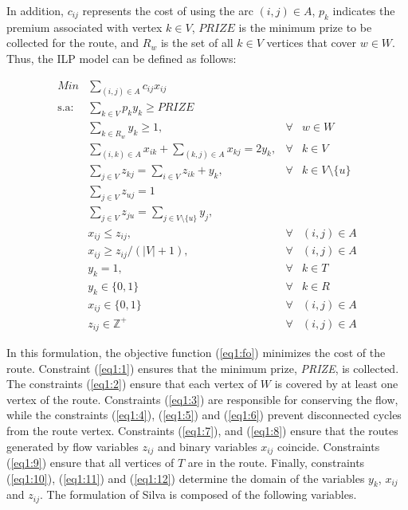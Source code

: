\documentclass{ro}
\begin{document}
In addition, $c_{ij}$ represents the cost of using the arc $(i,j) \in A$, $p_k$ indicates the premium associated with vertex $k\in V$, $PRIZE$ is the minimum prize to be collected for the route, and $R_w$ is the set of all $k\in V$ vertices that cover $w\in W$. Thus, the ILP model can be defined as follows:

{\small
	\begin{align}
	Min & \displaystyle \sum_{(i,j) \in A} c_{ij} x_{ij} \label{eq1:fo}\\
	\mbox{s.a}: & \displaystyle \sum_{k \in V}p_k y_k \geq PRIZE \label{eq1:1}\\
	&\displaystyle \sum_{k \in R_w} y_k \geq 1 ,&\forall& w \in W \label{eq1:2}\\
	&\displaystyle \sum_{(i,k) \in A}x_{ik} + \sum_{(k,j) \in A}x_{kj} = 2 y_k   ,&\forall& k \in V \label{eq1:3}\\
	&\displaystyle \sum_{j \in V} z_{kj} = \sum_{i \in V} z_{ik} +  y_k  ,&\forall& k \in V \setminus \{u\}\label{eq1:4}\\
	&\displaystyle \sum_{j \in V} z_{uj} = 1 \label{eq1:5}\\
	&\displaystyle \sum_{j \in V} z_{ju} = \sum_{j \in V \setminus \{u\}} y_j,\label{eq1:6} \\
	&\displaystyle x_{ij} \leq z_{ij} ,&\forall& (i,j) \in A\label{eq1:7} \\
	&\displaystyle x_{ij} \geq z_{ij}/(|V| + 1), &\forall& (i,j) \in A \label{eq1:8}\\
	&\displaystyle y_k = 1 ,&\forall& k \in T \label{eq1:9}\\
	&y_k \in \{0,1\} &\forall& k \in R\label{eq1:10} \\
	&x_{ij} \in \{0,1\} &\forall& (i,j) \in A \label{eq1:11}\\
	&z_{ij} \in \mathbb{Z}^+ &\forall& (i,j) \in A \label{eq1:12}
	\end{align}
}

In this formulation, the objective function (\ref{eq1:fo}) minimizes the cost of the route. Constraint (\ref{eq1:1}) ensures that the minimum prize, \textit{PRIZE}, is collected. The constraints (\ref{eq1:2}) ensure that each vertex of $W$ is covered by at least one vertex of the route. Constraints (\ref{eq1:3}) are responsible for conserving the flow, while the constraints (\ref{eq1:4}), (\ref{eq1:5}) and (\ref{eq1:6}) prevent disconnected cycles from the route vertex. Constraints (\ref{eq1:7}), and (\ref{eq1:8}) ensure that the routes generated by flow variables $z_{ij}$ and binary variables $x_{ij}$ coincide. Constraints (\ref{eq1:9}) ensure that all vertices of $T$ are in the route. Finally, constraints (\ref{eq1:10}), (\ref{eq1:11}) and (\ref{eq1:12}) determine the domain of the variables $y_k$, $x_{ij}$ and $z_{ij}$. The formulation of Silva \cite{silva2009problema}  is composed of the following variables.
\end{document}
